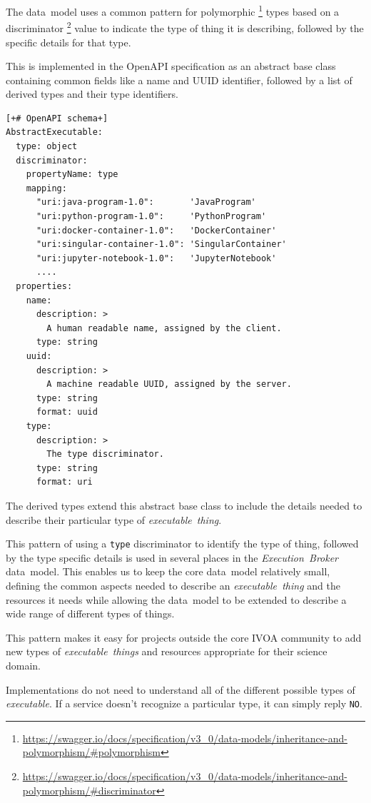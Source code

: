 \documentclass[11pt,a4paper]{ivoa}
\newcommand{\uuid} {UUID}
\newcommand{\openapi} {OpenAPI}
\newcommand{\datamodel} {data~model}
\newcommand{\ivoa} {IVOA}
\newcommand{\executionbroker} {\textit{Execution~Broker}}
\newcommand{\executable} {\textit{executable}}
\newcommand{\executablething}[1] {\textit{executable~thing#1}}
\newcommand{\codeword}[1] {\texttt{#1}}
\newcommand{\footurl}[1] {\footnote{\url{#1}}}
\begin{document}
The \datamodel{} uses a common pattern for polymorphic
\footurl{https://swagger.io/docs/specification/v3_0/data-models/inheritance-and-polymorphism/\#polymorphism}
types based on a discriminator
\footurl{https://swagger.io/docs/specification/v3_0/data-models/inheritance-and-polymorphism/\#discriminator}
value to indicate the type of thing it is describing, followed by the specific
details for that type.

This is implemented in the \openapi{} specification as an abstract base class
containing common fields like a name and \uuid{} identifier, followed by a list
of derived types and their type identifiers.

\begin{lstlisting}[]
[+# OpenAPI schema+]
AbstractExecutable:
  type: object
  discriminator:
    propertyName: type
    mapping:
      "uri:java-program-1.0":       'JavaProgram'
      "uri:python-program-1.0":     'PythonProgram'
      "uri:docker-container-1.0":   'DockerContainer'
      "uri:singular-container-1.0": 'SingularContainer'
      "uri:jupyter-notebook-1.0":   'JupyterNotebook'
      ....
  properties:
    name:
      description: >
        A human readable name, assigned by the client.
      type: string
    uuid:
      description: >
        A machine readable UUID, assigned by the server.
      type: string
      format: uuid
    type:
      description: >
        The type discriminator.
      type: string
      format: uri
\end{lstlisting}

The derived types extend this abstract base class to include the details needed to
describe their particular type of \executablething{}.

This pattern of using a \codeword{type} discriminator to identify the type of thing, followed
by the type specific details is used in several places in the \executionbroker{} \datamodel{}.
This enables us to keep the core \datamodel{} relatively small, defining the common aspects
needed to describe an \executablething{} and the resources it needs while allowing the
\datamodel{} to be extended to describe a wide range of different types of things.

This pattern makes it easy for projects outside the core \ivoa{} community to add new
types of \executablething{s} and resources appropriate for their science domain.

Implementations do not need to understand all of the different possible types of \executable{}.
If a service doesn’t recognize a particular type, it can simply reply \codeword{NO}.
\end{document}

